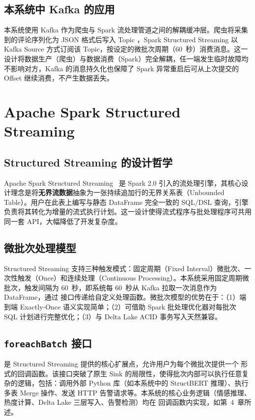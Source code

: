\subsection{本系统中 Kafka 的应用}

本系统使用 Kafka 作为爬虫与 Spark 流处理管道之间的解耦缓冲层。爬虫将采集到的评论序列化为 JSON 格式后写入 Topic ，Spark Structured Streaming 以 Kafka Source 方式订阅该 Topic，按设定的微批次周期（60~秒）消费消息。这一设计将数据生产（爬虫）与数据消费（Spark）完全解耦，任一端发生临时故障均不影响对方，Kafka 的消息持久化也保障了 Spark 异常重启后可从上次提交的 Offset 继续消费，不产生数据丢失。

\section{Apache Spark Structured Streaming}

\subsection{Structured Streaming 的设计哲学}

Apache Spark Structured Streaming~\cite{armbrust2018structured} 是 Spark 2.0 引入的流处理引擎，其核心设计理念是将\textbf{无界流数据}抽象为一张持续追加行的无界关系表（Unbounded Table）。用户在此表上编写与静态 DataFrame 完全一致的 SQL/DSL 查询，引擎负责将其转化为增量的流式执行计划。这一设计使得流式程序与批处理程序可共用同一套 API，大幅降低了开发复杂度。

\subsection{微批次处理模型}

Structured Streaming 支持三种触发模式：固定周期（Fixed Interval）微批次、一次性触发（Once）和连续处理（Continuous Processing）。本系统采用固定周期微批次，触发间隔为 60~秒，即系统每 60~秒从 Kafka 拉取一次消息作为 DataFrame，通过  接口传递给自定义处理函数。微批次模型的优势在于：（1）端到端 Exactly-Once 语义实现简单；（2）可借助 Spark 批处理优化器对每批次 SQL 计划进行完整优化；（3）与 Delta Lake ACID 事务写入天然兼容。

\subsection{\texttt{foreachBatch} 接口}

 是 Structured Streaming 提供的核心扩展点，允许用户为每个微批次提供一个  形式的回调函数。该接口突破了原生 Sink 的局限性，使得批次内部可以执行任意复杂的逻辑，包括：调用外部 Python 库（如本系统中的 StructBERT 推理）、执行多表 Merge 操作、发送 HTTP 告警请求等。本系统的核心业务逻辑（情感推理、热度计算、Delta Lake 三层写入、告警检测）均在  回调函数内实现，如第~4~章所述。

